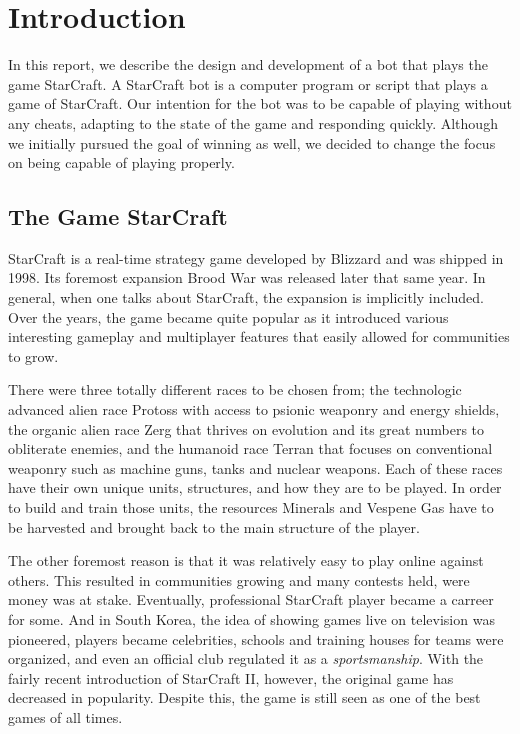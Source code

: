 
\chapter{Introduction}

In this report, we describe the design and development of a bot that plays the game StarCraft. A StarCraft bot is a computer program or script that plays a game of StarCraft. Our intention for the bot was to be capable of playing without any cheats, adapting to the state of the game and responding quickly. Although we initially pursued the goal of winning as well, we decided to change the focus on being capable of playing properly.

\section{The Game StarCraft}

StarCraft is a real-time strategy game developed by Blizzard and was shipped in 1998. Its foremost expansion Brood War was released later that same year. In general, when one talks about StarCraft, the expansion is implicitly included. Over the years, the game became quite popular as it introduced various interesting gameplay and multiplayer features that easily allowed for communities to grow.

There were three totally different races to be chosen from; the technologic advanced alien race Protoss with access to psionic weaponry and energy shields, the organic alien race Zerg that thrives on evolution and its great numbers to obliterate enemies, and the humanoid race Terran that focuses on conventional weaponry such as machine guns, tanks and nuclear weapons. Each of these races have their own unique units, structures, and how they are to be played. In order to build and train those units, the resources Minerals and Vespene Gas have to be harvested and brought back to the main structure of the player.

The other foremost reason is that it was relatively easy to play online against others. This resulted in communities growing and many contests held, were money was at stake. Eventually, professional StarCraft player became a carreer for some. And in South Korea, the idea of showing games live on television was pioneered, players became celebrities, schools and training houses for teams were organized, and even an official club regulated it as a \emph{sportsmanship}. With the fairly recent introduction of StarCraft II, however, the original game has decreased in popularity. Despite this, the game is still seen as one of the best games of all times.

